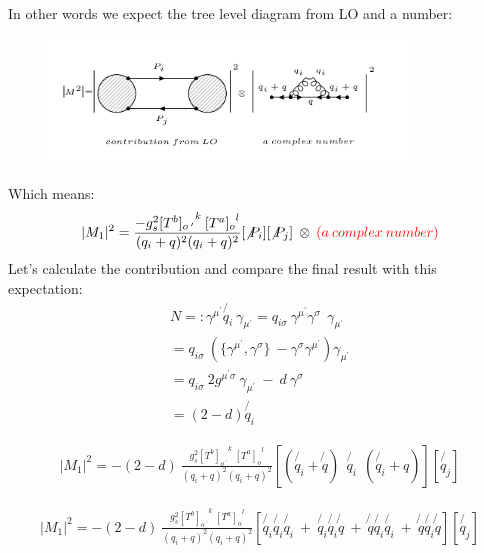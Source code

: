In other words we expect the tree level diagram from LO and a number:
\begin{figure}[h!]
\centering
\includegraphics[width=0.85\textwidth]{images/expectationqg-qbar.png}
\end{figure}
Which means:\\
\begin{equation}
\begin{split}
|M_1|^2=\frac{-g_s^2  {[T^b]_{o\:^{\prime}}}^k \: {[T^a]_o}^l }{(q_i + q)^2 (q_i + q)^2}
[\not{P_i}]
[\not{P_j}]\:\otimes \: {\color[RGB]{255,0,0} (a\: complex\: number)}
\end{split}
\end{equation}  
Let's calculate the contribution and compare the final result with this expectation:
\begin{equation}
\begin{split}
N=: \gamma^{{\mu}^{\prime}} \not{q_i} \: \gamma_{{\mu}^{\prime}} = {q_{i\sigma}} \: \gamma^{{\mu}^{\prime}} \gamma^{\sigma} \:\: \gamma_{{\mu}^{\prime}}\\
={q_{i\sigma}} \: (\lbrace{\gamma^{{\mu}^{\prime}}}, {\gamma^{\sigma}}\rbrace \: - {\gamma^{\sigma}}{\gamma^{{\mu}^{\prime}}})\gamma_{{\mu}^{\prime}}\\
={q_{i\sigma}} \: 2g^{{{\mu}^{\prime}}{\sigma}} \: \gamma_{{\mu}^{\prime}} \: - \:d\:{\gamma^{\sigma}}\\
=(2-d) \not{q_i}
\end{split}
\end{equation}

\begin{equation}
\begin{split}
|M_1|^2=-(2-d)\:\frac{g_s^2  {[T^b]_{o\:^{\prime}}}^k \: {[T^a]_o}^l }{(q_i + q)^2 (q_i + q)^2}
[(\not{q_i} + \not{q}) \:
 \:\not{q_i} \: 
 \: (\not{q_i} + q)]
[\not{q_j}]
\end{split}
\end{equation}

\begin{equation}
\begin{split}
|M_1|^2=-(2-d)\:\frac{g_s^2  {[T^b]_{o\:^{\prime}}}^k \: {[T^a]_o}^l }{(q_i + q)^2 (q_i + q)^2}
[\not{q_i} \not{q_i} \not{q_i} \: + \: \not{q_i} \not{q_i} \not{q} \: + \: \not{q} \not{q_i} \not{q_i} \:+\: \not{q} \not{q_i} \not{q}]
[\not{q_j}]
\end{split}
\end{equation}

